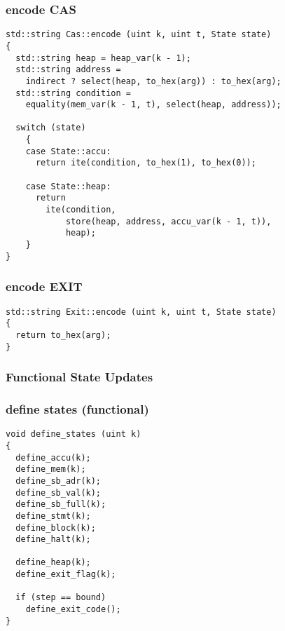 \subsubsection{encode CAS}

\begin{lstlisting}[style=c++]
std::string Cas::encode (uint k, uint t, State state)
{
  std::string heap = heap_var(k - 1);
  std::string address =
    indirect ? select(heap, to_hex(arg)) : to_hex(arg);
  std::string condition =
    equality(mem_var(k - 1, t), select(heap, address));

  switch (state)
    {
    case State::accu:
      return ite(condition, to_hex(1), to_hex(0));

    case State::heap:
      return
        ite(condition,
            store(heap, address, accu_var(k - 1, t)),
            heap);
    }
}
\end{lstlisting}

\subsubsection{encode EXIT}

\begin{lstlisting}[style=c++]
std::string Exit::encode (uint k, uint t, State state)
{
  return to_hex(arg);
}
\end{lstlisting}

\subsubsection{Functional State Updates}

\subsubsection{define states (functional)}

\begin{lstlisting}[style=c++]
void define_states (uint k)
{
  define_accu(k);
  define_mem(k);
  define_sb_adr(k);
  define_sb_val(k);
  define_sb_full(k);
  define_stmt(k);
  define_block(k);
  define_halt(k);

  define_heap(k);
  define_exit_flag(k);

  if (step == bound)
    define_exit_code();
}
\end{lstlisting}

